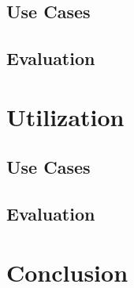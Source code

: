 \documentclass[sigconf,anonymous,review]{acmart}
\begin{document}
\subsection{Use Cases}

\subsection{Evaluation}

\section{Utilization}
\label{sec:utilization}

\subsection{Use Cases}

\subsection{Evaluation}

\section{Conclusion}

\nocite{*}
\clearpage



\end{document}
